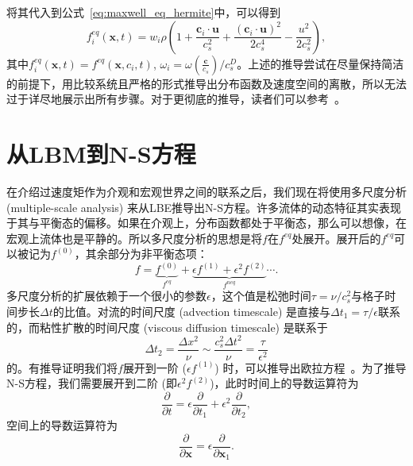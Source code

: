 将其代入到公式~\ref{eq:maxwell_eq_hermite}中，可以得到
\begin{equation}
    f_i^{eq}(\boldsymbol{x}, t)=w_i \rho\left(1+\frac{\mathbf{c}_i \cdot \boldsymbol{u}}{c_s^2}+\frac{\left(\mathbf{c}_i \cdot \boldsymbol{u}\right)^2}{2 c_s^4}-\frac{u^2}{2 c_s^2}\right),
    \label{eq:f_eq_o2}
\end{equation}
其中$f_i^{eq}(\boldsymbol{x}, t)=f^{eq}(\boldsymbol{x}, {c}_i, t)$, $\omega_i=\omega(\frac{\mathbf{c}}{c_s})/c_s^D$。上述的推导尝试在尽量保持简洁的前提下，用比较系统且严格的形式推导出分布函数及速度空间的离散，所以无法过于详尽地展示出所有步骤。对于更彻底的推导，读者们可以参考~\cite{shan2006kinetic, malaspinas2010lattice}。


\section{从LBM到N-S方程}
在介绍过速度矩作为介观和宏观世界之间的联系之后，我们现在将使用多尺度分析 (multiple-scale analysis) 来从LBE推导出N-S方程。许多流体的动态特征其实表现于其与平衡态的偏移。如果在介观上，分布函数都处于平衡态，那么可以想像，在宏观上流体也是平静的。所以多尺度分析的思想是将$f$在$f^{eq}$处展开。展开后的$f^{eq}$可以被记为$f^{(0)}$，其余部分为非平衡态项：
\begin{equation}
    f=\underbrace{f^{(0)}}_{f^{e q}}+\underbrace{\epsilon f^{(1)}+\epsilon^2 f^{(2)}}_{f^{n e q}} \cdots .
\end{equation}
多尺度分析的扩展依赖于一个很小的参数$\epsilon$，这个值是松弛时间$\tau=\nu/c_s^2$与格子时间步长$\Delta t$的比值。对流的时间尺度 (advection timescale) 是直接与$\Delta t_1=\tau/\epsilon$联系的，而粘性扩散的时间尺度 (viscous diffusion timescale) 是联系于
\begin{equation}
    \Delta t_2=\frac{\Delta x^2}{\nu} \sim \frac{c_s^2 \Delta t^2}{\nu}=\frac{\tau}{\epsilon^2}
    \label{eq:ms_f}
\end{equation}
的。有推导证明我们将$f$展开到一阶 ($\epsilon f^{(1)}$) 时，可以推导出欧拉方程~\cite{huang2008statistical}。为了推导N-S方程，我们需要展开到二阶 (即$\epsilon^2 f^{(2)}$)，此时时间上的导数运算符为
\begin{equation}
    \frac{\partial}{\partial t}=\epsilon \frac{\partial}{\partial t_1}+\epsilon^2 \frac{\partial}{\partial t_2},
    \label{eq:ms_t}
\end{equation}
空间上的导数运算符为
\begin{equation}
    \frac{\partial}{\partial \boldsymbol{x}}=\epsilon \frac{\partial}{\partial \boldsymbol{x}_1}.
    \label{eq:ms_x}
\end{equation}
